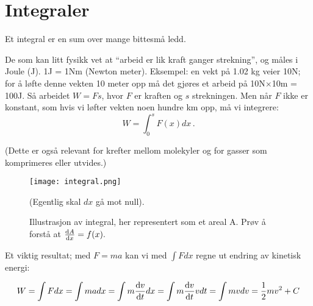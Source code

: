 \documentclass[11pt, A4paper]{article}
\begin{document}
\newpage
\section{Integraler}
Et integral er en sum over mange bittesmå ledd.

De som kan litt fysikk vet at ``arbeid er lik kraft ganger strekning'', og måles i Joule (J). 1J = 1Nm (Newton meter). Eksempel: en vekt på 1.02 kg veier 10N; for å løfte denne vekten 10 meter opp må det gjøres et arbeid på 10N$\times$10m = 100J. Så arbeidet $W=Fs$, hvor $F$ er kraften og $s$ strekningen. Men når $F$ ikke er konstant, som hvis vi løfter vekten noen hundre km opp, må vi integrere:
\begin{equation}
\label{eq:17}
W=\int_0^s F(x) dx\,.
\end{equation}

(Dette er også relevant for krefter mellom molekyler og for gasser som komprimeres eller utvides.)



\begin{figure}[h]
  \centerline{\texttt{[image: integral.png]}}
  \caption{Illustrasjon av integral, her representert som et areal A. Prøv å forstå at $\dv{A}{x} = f(x).$} (Egentlig skal $dx$ gå mot null).
  \label{fig:interp_example}
\end{figure}

  

Et viktig resultat; med $F=ma$ kan vi med $\int Fdx$ regne ut endring av kinetisk energi: 

\begin{equation}
\label{eq:18}
W = \int F dx = \int ma dx = \int m \dv{v}{t} dx =\int m \dv{v}{t} v dt = \int m v dv = \frac{1}{2} m v^2 + C
\end{equation}
\end{document}
